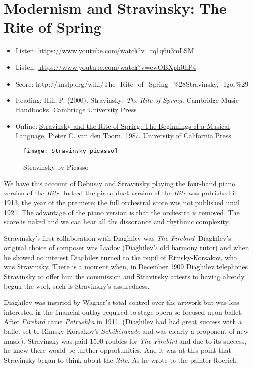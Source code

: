\section{Modernism and Stravinsky: The Rite of Spring}
\begin{itemize}
\item Listen: \url{https://www.youtube.com/watch?v=rq1q6u3mLSM}
\item Listen: \url{https://www.youtube.com/watch?v=ewOBXph0hP4}
\item Score: \url{http://imslp.org/wiki/The_Rite_of_Spring_%28Stravinsky,_Igor%29}
\item Reading: Hill, P. (2000). Stravinsky: \textit{The Rite of Spring.} Cambridge Music Handbooks. Cambridge University Press
\item Online: \href{http://publishing.cdlib.org/ucpressebooks/view?docId=ft967nb647;brand=ucpress}{Stravinsky and the Rite of Spring: The Beginnings of a Musical Language, Pieter C. van den Toorn. 1987. University of California Press}

\end{itemize}

\begin{figure}[H]
\centering
\texttt{[image: Stravinsky\_picasso]}\caption{Stravinsky by Picasso}
\label{fig:stravpicasso}
\end{figure}

We have this account of Debussy and Stravinsky playing the four-hand piano version of the \textit{Rite}. Indeed the piano duet version of the \textit{Rite} was published in 1913, the year of the premiere; the full orchestral score was not published until 1921. The advantage of the piano version is that the orchestra is removed. The score is naked and we can hear all the dissonance and rhythmic complexity. 

Stravinsky's first collaboration with Diaghilev was \textit{The Firebird}. Diaghilev's original choice of composer was Liadov (Diaghilev's old harmony tutor) and when he showed no interest Diaghilev turned to the pupil of Rimsky-Korsakov, who was Stravinsky. There is a moment when, in December 1909 Diaghilev telephones Stravinsky to offer him the commission and Stravinsky attests to having already begun the work such is Stravinsky's assuredness. 

Diaghilev was inspried by Wagner's total control over the artwork but was less interested in the financial outlay required to stage opera so focused upon ballet. After \textit{Firebird} came \textit{Petrushka} in 1911. (Diaghilev had had great success with a ballet set to Rimsky-Korsakov's \textit{Sch\'eh\'erazade} and was clearly a proponent of new music). Stravinsky was paid 1500 roubles for \textit{The Firebird} and due to its success, he knew there would be further opportunities. And it was at this point that Stravinsky began to think about the \textit{Rite}. As he wrote to the painter Roerich:

